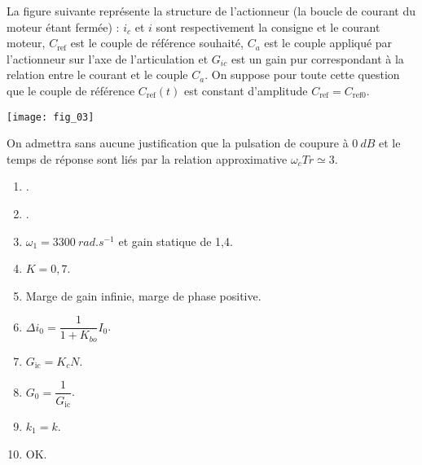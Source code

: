 \begin{multicols}{2}
La figure suivante représente la structure de l’actionneur (la boucle de courant du moteur étant fermée) : $i_c$ et $i$
sont respectivement la consigne et le courant moteur, $C_{\text{ref}}$ est le couple de référence souhaité, $C_a$ est le couple
appliqué par l’actionneur sur l’axe de l’articulation et $G_{ic}$ est un gain pur correspondant à la relation entre le
courant et le couple $C_a$. On suppose pour toute cette question que le couple de référence $C_{\text{ref}} (t)$ est constant
d’amplitude $C_{\text{ref}} = C_{\text{ref0}}$.


\begin{center}
\texttt{[image: fig\_03]}
\end{center}

\ifprof
\begin{corrige}
\end{corrige}
\else
\fi


\ifprof
\begin{corrige}
\end{corrige}
\else
\fi

\ifprof
\begin{corrige}
\end{corrige}
\else
\fi


\ifprof
\begin{corrige}
\end{corrige}
\else
\fi

On admettra sans aucune justification que la pulsation de coupure à $\SI{0}{dB}$ et le temps de réponse sont liés par la relation approximative $\omega_cTr \simeq 3$.

\ifcolle
\else
\footnotesize
\begin{enumerate}
\item .
\item .
\item $\omega_1 = \SI{3300}{rad.s^{-1}}$ et gain statique de 1,4.
\item $K = 0,7$.
\item Marge de gain infinie, marge de phase positive.
\item $\Delta i_0 = \dfrac{1}{1+K_{bo}}I_0$.
\item $G_{\text{ic}} = K_c N$.
\item $G_0 = \dfrac{1}{G_{\text{ic}}}$.
\item $k_1 = k$.
\item OK.
\end{enumerate}
\normalsize
\fi


\end{multicols}
